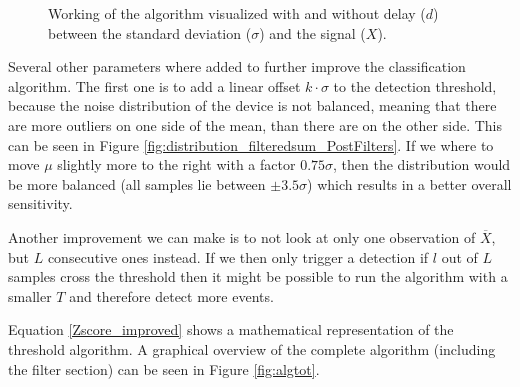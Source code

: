 \begin{figure}
	\centering     %
	\caption{Working of the algorithm visualized with and without delay ($d$) between the standard deviation ($\sigma$) and the signal ($X$).\label{fig:InfluenceOfD}}
\end{figure}

Several other parameters where added to further improve the classification algorithm. The first one is to add a linear offset $k\cdot\sigma$ to the detection threshold, because the noise distribution of the device is not balanced, meaning that there are more outliers on one side of the mean, than there are on the other side. This can be seen in Figure \ref{fig:distribution_filteredsum_PostFilters}. If we where to move $\mu$ slightly more to the right with a factor $0.75 \sigma$, then the distribution would be more balanced (all samples lie between $\pm 3.5\sigma$) which results in a better overall sensitivity.

Another improvement we can make is to not look at only one observation of $\overline{X}$, but $L$ consecutive ones instead. If we then only trigger a detection if $l$ out of $L$ samples cross the threshold then it might be possible to run the algorithm with a smaller $T$ and therefore detect more events. 

Equation \ref{Zscore_improved} shows a mathematical representation of the threshold algorithm. A graphical overview of the complete algorithm (including the filter section) can be seen in Figure \ref{fig:algtot}.

